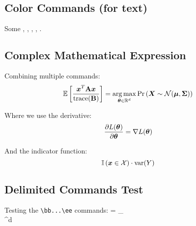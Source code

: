 \documentclass[11pt,letterpaper]{article}
\begin{document}
\subsection{Color Commands (for text)}
Some , , , , .


\subsection{Complex Mathematical Expression}
Combining multiple commands:
$$\mathbb{E}\left[\frac{\displaystyle \boldsymbol{x}^T \mathbf{A} \boldsymbol{x}}{\displaystyle \mathrm{trace}(\mathbf{B})}\right] = \operatorname*{arg\,max}_{\boldsymbol{\theta} \in \mathbb{R}^d} \mathrm{Pr}\left(\boldsymbol{X} \sim \mathcal{N}(\boldsymbol{\mu}, \mathbf{\Sigma})\right)$$

Where we use the derivative:
$$\frac{\displaystyle \partial L(\boldsymbol{\theta})}{\displaystyle \partial \boldsymbol{\theta}} = \nabla L(\boldsymbol{\theta})$$

And the indicator function:
$$\mathbb{I}\left(\boldsymbol{x} \in \mathcal{X}\right) \cdot \mathrm{var}(Y)$$

\subsection{Delimited Commands Test}
Testing the \verb|\bb...\ee| commands:
\bb
{} = \argmax_{} \E{} \\
  \in \RR^d
\ee
\end{document}
